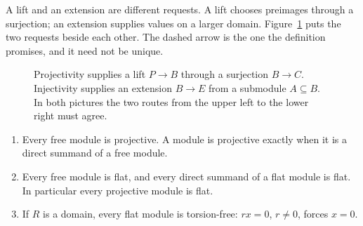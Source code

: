A lift and an extension are different requests. A lift chooses preimages through a surjection; an extension supplies values on a larger domain. Figure~\ref{fig:v10new-ch03-lifts} puts the two requests beside each other. The dashed arrow is the one the definition promises, and it need not be unique.

\begin{figure}[ht]
\centering
{}
\caption{Projectivity supplies a lift $P\to B$ through a surjection $B\to C$. Injectivity supplies an extension $B\to E$ from a submodule $A\subseteq B$. In both pictures the two routes from the upper left to the lower right must agree.}
\label{fig:v10new-ch03-lifts}
\end{figure}

\begin{proposition}\label{prop:projective}
\leavevmode
\begin{enumerate}[label=(\alph*)]
\item Every free module is projective. A module is projective exactly when it is a direct summand of a free module.
\item Every free module is flat, and every direct summand of a flat module is flat. In particular every projective module is flat.
\item If $R$ is a domain, every flat module is torsion-free: $rx=0$, $r\ne0$, forces $x=0$.
\end{enumerate}
\end{proposition}

